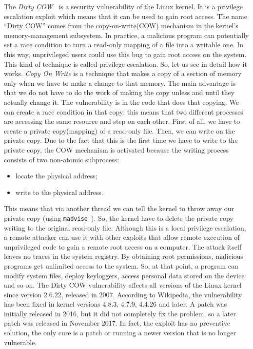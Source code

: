\documentclass{masterthesis}
\begin{document}
The \emph{Dirty COW}~\cite{alam2017study} is a security vulnerability of the Linux kernel. It is a privilege escalation exploit which means that it can be used to gain root access.
The name ``Dirty COW'' comes from the copy-on-write(COW) mechanism in the kernel's memory-management subsystem. 
In practice, a malicious program can potentially set a race condition to turn a read-only mapping of a file into a writable one. In this way, unprivileged users could use this bug to gain root access on the system. This kind of technique is called privilege escalation.
So, let us see in detail how it works.
\emph{Copy On Write} is a technique that makes a copy of a section of memory only when we have to make a change to that memory. The main advantage is that we do not have to do the work of making the copy unless and until they actually change it. The vulnerability is in the code that does that copying. We can create a race condition in that copy: this means that two different processes are accessing the same resource and step on each other. 
First of all, we have to create a private copy(mapping) of a read-only file. Then, we can write on the private copy. Due to the fact that this is the first time we have to write to the private copy, the COW mechanism is activated because the writing process consists of two non-atomic subprocess:
\begin{itemize}
\item locate the physical address;
\item write to the physical address.
\end{itemize}
This means that via another thread we can tell the kernel to throw away our private copy (using \texttt{madvise}~\cite{madvise}). So, the kernel have to delete the private copy writing to the original read-only file.
Although this is a local privilege escalation, a remote attacker can use it with other exploits that allow remote execution of unprivileged code to gain a remote root access on a computer. The attack itself leaves no traces in the system registry.
By obtaining root permissions, malicious programs get unlimited access to the system.
So, at that point, a program can modify system files, deploy keyloggers, access personal data stored on the device and so on.
The Dirty COW vulnerability affects all versions of the Linux kernel since version 2.6.22, released in 2007. According to Wikipedia, the vulnerability has been fixed in kernel versions 4.8.3, 4.7.9, 4.4.26 and later. 
A patch was initially released in 2016, but it did not completely fix the problem, so a later patch was released in November 2017. In fact, the exploit has no preventive solution, the only cure is a patch or running a newer version that is no longer vulnerable.
\end{document}
